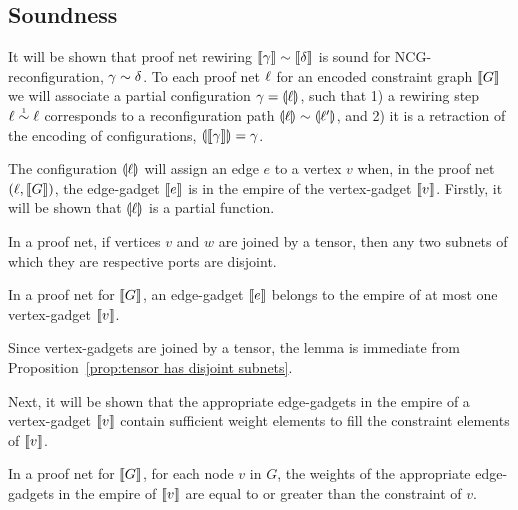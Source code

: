 \documentclass[conference]{IEEEtran}
\let\capsabbrev=\uppercase
\begin{document}

\subsection*{Soundness}


It will be shown that proof net rewiring $\itn\gamma\perm\itn\delta$ is sound for \capsabbrev{ncg}-reconfiguration, $\gamma\perm\delta$.
%
To each proof net $\ell$ for an encoded constraint graph $\llbracket G\rrbracket$ we will associate a partial configuration $\gamma=\llparenthesis\ell\rrparenthesis$, such that 1) a rewiring step $\links\perm*\links$ corresponds to a reconfiguration path $\coitn\links\perm\coitn{\links'}$, and 2) it is a retraction of the encoding of configurations, $\llparenthesis\llbracket\gamma\rrbracket\rrparenthesis=\gamma$.



The configuration $\llparenthesis\ell\rrparenthesis$ will assign an edge $e$ to a vertex $v$ when, in the proof net $(\ell,\llbracket G\rrbracket)$, the edge-gadget $\llbracket e\rrbracket$ is in the empire of the vertex-gadget $\llbracket v\rrbracket$.
%
Firstly, it will be shown that $\llparenthesis\ell\rrparenthesis$ is a partial function.


\begin{proposition}
\label{prop:tensor has disjoint subnets}
In a proof net, if vertices $v$ and $w$ are joined by a tensor, then any two subnets of which they are respective ports are disjoint.
\end{proposition}


\begin{lemma}
In a proof net for $\llbracket G\rrbracket$, an edge-gadget $\llbracket e\rrbracket$ belongs to the empire of at most one vertex-gadget $\llbracket v\rrbracket$.
\end{lemma}

\begin{IEEEproof}
Since vertex-gadgets are joined by a tensor, the lemma is immediate from Proposition~\ref{prop:tensor has disjoint subnets}.
\end{IEEEproof}


Next, it will be shown that the appropriate edge-gadgets in the empire of a vertex-gadget $\llbracket v\rrbracket$ contain sufficient weight elements to fill the constraint elements of $\llbracket v\rrbracket$.


\begin{lemma}
\label{lem:appropriate edge weights}
In a proof net for $\llbracket G\rrbracket$, for each node $v$ in $G$, the weights of the appropriate edge-gadgets in the empire of $\llbracket v\rrbracket$ are equal to or greater than the constraint of $v$.
\end{lemma}
\end{document}
